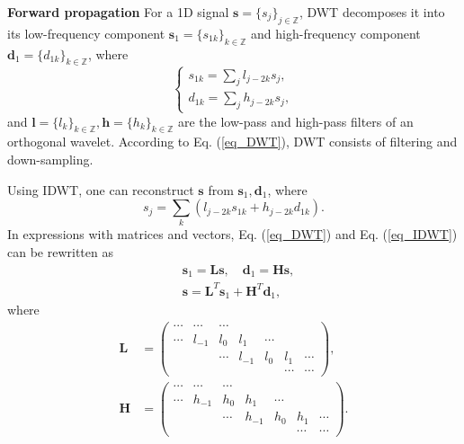 \documentclass[10pt,twocolumn,letterpaper]{article}
\begin{document}
\textbf{Forward propagation}\quad
For a 1D signal $\textbf{s} = \{s_j\}_{j\in\mathbb{Z}}$,
DWT decomposes it into its low-frequency component $\textbf{s}_1 = \{s_{1k}\}_{k\in\mathbb{Z}}$
and high-frequency component $\textbf{d}_1 = \{d_{1k}\}_{k\in\mathbb{Z}}$,
where
\begin{equation}\label{eq_DWT}
\left\{
\begin{array}{l}
s_{1k} = \sum_j l_{j-2k} s_j, \\
d_{1k} = \sum_j h_{j-2k} s_j,
\end{array}
\right.
\end{equation}
and $\textbf{l} = \{l_k\}_{k\in\mathbb{Z}}, \textbf{h} = \{h_k\}_{k\in\mathbb{Z}}$ are the low-pass
and high-pass filters of an orthogonal wavelet.
According to Eq. (\ref{eq_DWT}), DWT consists of filtering and down-sampling.

Using IDWT, one can reconstruct $\textbf{s}$ from $\textbf{s}_1, \textbf{d}_1$, where
\begin{equation}\label{eq_IDWT}
s_j = \sum_k\left(l_{j-2k} s_{1k} + h_{j-2k} d_{1k}\right).
\end{equation}
In expressions with matrices and vectors, Eq. (\ref{eq_DWT}) and Eq. (\ref{eq_IDWT}) can be rewritten as
\begin{align}
\label{eq_DWT_M_s}
&\textbf{s}_1 = \textbf{L}\textbf{s},\quad\textbf{d}_1 = \textbf{H}\textbf{s},\\
\label{eq_IDWT_M}
&\textbf{s} = \textbf{L}^T \textbf{s}_1 + \textbf{H}^T \textbf{d}_1,
\end{align}
where
\begin{align}
\textbf{L} &=
\left(
\begin{array}{ccccccc}
	\cdots & \cdots & \cdots &        &        &        &                \\
	\cdots & l_{-1} &  l_0   &  l_1   & \cdots &        &                \\
	       &        & \cdots & l_{-1} &  l_0   &  l_1   & \cdots         \\
	       &        &        &        &        & \cdots & \cdots
\end{array}
\right),\\
\textbf{H} &=
\left(
\begin{array}{ccccccc}
	\cdots & \cdots & \cdots &        &        &        &          \\
	\cdots & h_{-1} &  h_0   &  h_1   & \cdots &        &          \\
	       &        & \cdots & h_{-1} &  h_0   &  h_1   & \cdots   \\
	       &        &        &        &        & \cdots & \cdots
\end{array}
\right).
\end{align}
\end{document}
